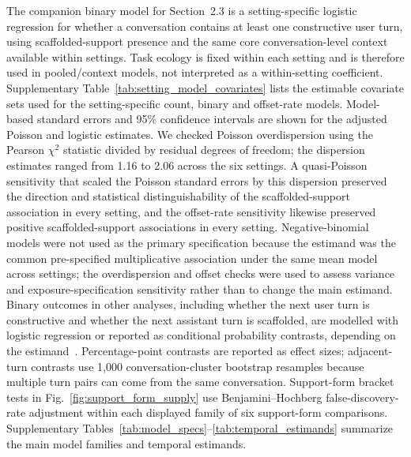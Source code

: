 The companion binary model for Section~2.3 is a setting-specific logistic regression for whether a conversation contains at least one constructive user turn, using scaffolded-support presence and the same core conversation-level context available within settings. Task ecology is fixed within each setting and is therefore used in pooled/context models, not interpreted as a within-setting coefficient. Supplementary Table~\ref{tab:setting_model_covariates} lists the estimable covariate sets used for the setting-specific count, binary and offset-rate models. Model-based standard errors and 95\% confidence intervals are shown for the adjusted Poisson and logistic estimates. We checked Poisson overdispersion using the Pearson $\chi^2$ statistic divided by residual degrees of freedom; the dispersion estimates ranged from 1.16 to 2.06 across the six settings. A quasi-Poisson sensitivity that scaled the Poisson standard errors by this dispersion preserved the direction and statistical distinguishability of the scaffolded-support association in every setting, and the offset-rate sensitivity likewise preserved positive scaffolded-support associations in every setting. Negative-binomial models were not used as the primary specification because the estimand was the common pre-specified multiplicative association under the same mean model across settings; the overdispersion and offset checks were used to assess variance and exposure-specification sensitivity rather than to change the main estimand. Binary outcomes in other analyses, including whether the next user turn is constructive and whether the next assistant turn is scaffolded, are modelled with logistic regression or reported as conditional probability contrasts, depending on the estimand~\cite{mccullagh2019generalized,agresti2013categorical}. Percentage-point contrasts are reported as effect sizes; adjacent-turn contrasts use 1,000 conversation-cluster bootstrap resamples because multiple turn pairs can come from the same conversation. Support-form bracket tests in Fig.~\ref{fig:support_form_supply} use Benjamini--Hochberg false-discovery-rate adjustment within each displayed family of six support-form comparisons. Supplementary Tables~\ref{tab:model_specs}--\ref{tab:temporal_estimands} summarize the main model families and temporal estimands.

